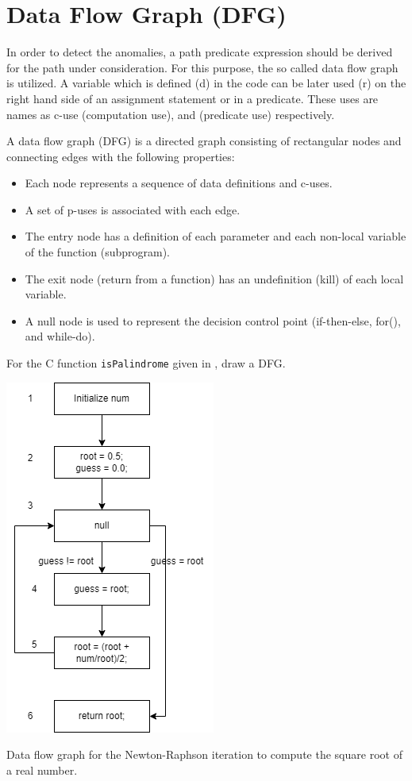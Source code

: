 \section{Data Flow Graph (DFG)}
In order to detect the anomalies, a path predicate expression should be derived for the path under consideration. For this purpose, the so called data flow graph is utilized. A variable which is defined (d) in the code can be later used (r) on the right hand side of an assignment statement or in a predicate. These uses are names as c-use (computation use), and  (predicate use) respectively.  

A data flow graph (DFG) is a directed graph consisting of rectangular nodes and connecting edges with the following properties:
\begin{itemize}
    \item  Each node represents a sequence of data definitions and c-uses.
    \item A set of p-uses is associated with each edge.
    \item The entry node has a definition of each parameter and each non-local variable of the function (subprogram).
    \item The exit node (return from a function) has an undefinition (kill) of each local variable.
    \item A null node is used to represent the decision control point (if-then-else, for(), and while-do).
\end{itemize}

\begin{example}
For the C function \lstinline!isPalindrome! given in , draw a DFG.
\end{example}

\begin{marginfigure}
    \includegraphics{images/dfg-2.png}
    \caption{Data flow graph for the Newton-Raphson iteration to compute the square root of a real number.}
\end{marginfigure}

